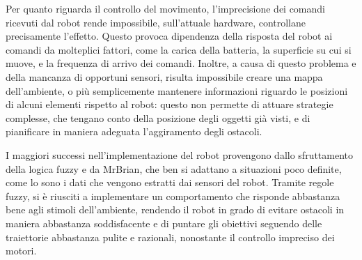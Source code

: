 Per quanto riguarda il controllo del movimento, l'imprecisione dei comandi ricevuti dal robot rende impossibile, sull'attuale hardware, controllane precisamente l'effetto. Questo provoca dipendenza della risposta del robot ai comandi da molteplici fattori, come la carica della batteria, la superficie su cui si muove, e la frequenza di arrivo dei comandi. Inoltre, a causa di questo problema e della mancanza di opportuni sensori, risulta impossibile creare una mappa dell'ambiente, o più semplicemente mantenere informazioni riguardo le posizioni di alcuni elementi rispetto al robot: questo non permette di attuare strategie complesse, che tengano conto della posizione degli oggetti già visti, e di pianificare in maniera adeguata l'aggiramento degli ostacoli. %

I maggiori successi nell'implementazione del robot provengono dallo sfruttamento della logica fuzzy e da MrBrian, che ben si adattano a situazioni poco definite, come lo sono i dati che vengono estratti dai sensori del robot. Tramite regole fuzzy, si è riusciti a implementare un comportamento che risponde abbastanza bene agli stimoli dell'ambiente, rendendo il robot in grado di evitare ostacoli in maniera abbastanza soddisfacente e di puntare gli obiettivi seguendo delle traiettorie abbastanza pulite e razionali, nonostante il controllo impreciso dei motori. %


